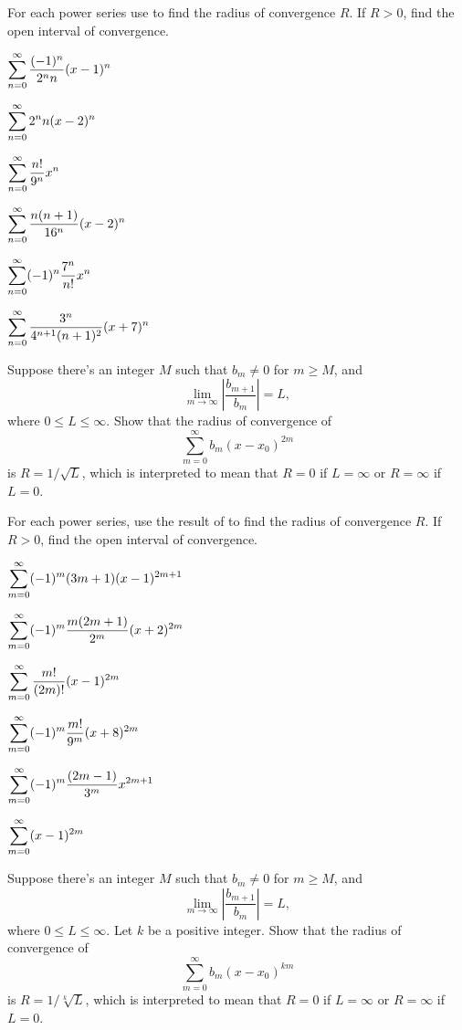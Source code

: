 \exercises
\begin{exerciselist}

\item\label{exer:7.1.1}For each power series use  to find the radius
of convergence $R$. If $R>0$, find the open interval of convergence.
\begin{alist*}[columns=2]
\item $\displaystyle{\sum_{n=0}^\infty\frac{(-1)^n}{2^nn}(x-1)^n}$
\item $\displaystyle{\sum_{n=0}^\infty 2^nn(x-2)^n}$
\item $\displaystyle{\sum_{n=0}^\infty\frac{n!}{9^n}x^n}$
\item $\displaystyle{\sum_{n=0}^\infty\frac{n(n+1)}{16^n}(x-2)^n}$
\item $\displaystyle{\sum_{n=0}^\infty (-1)^n\frac{7^n}{n!}x^n}$
\item $\displaystyle{\sum_{n=0}^\infty \frac{3^n}{4^{n+1}(n+1)^2}(x+7)^n}$
\end{alist*}

\item\label{exer:7.1.2}Suppose there's an
integer $M$ such that $b_m\ne0$ for $m\ge M$,  and
\[
\lim_{m\to\infty}\left|\frac{b_{m+1}}{b_m}\right|=L,
\]
where $0\le L\le\infty$. Show that the radius of convergence of
\[
\sum_{m=0}^\infty b_m(x-x_0)^{2m}
\]
is $R=1/\sqrt L$,
which is  interpreted  to mean that $R=0$ if $L=\infty$ or
$R=\infty$ if $L=0$.

\item\label{exer:7.1.3}For each power series, use the result of  to find
the radius of convergence $R$. If $R>0$, find the open interval of
convergence.
\begin{alist*}[columns=2]
\item $\displaystyle{\sum_{m=0}^\infty (-1)^m(3m+1)(x-1)^{2m+1}}$
\item $\displaystyle{\sum_{m=0}^\infty (-1)^m\frac{m(2m+1)}{2^m}(x+2)^{2m}}$
\item $\displaystyle{\sum_{m=0}^\infty\frac{m!}{(2m)!}(x-1)^{2m}}$
\item $\displaystyle{\sum_{m=0}^\infty (-1)^m\frac{m!}{9^m}(x+8)^{2m}}$
\item $\displaystyle{\sum_{m=0}^\infty(-1)^m\frac{(2m-1)}{3^m}x^{2m+1}}$
\item $\displaystyle{\sum_{m=0}^\infty(x-1)^{2m}}$
\end{alist*}

\item\label{exer:7.1.4}Suppose there's an integer $M$ such that $b_m\ne0$ for $m\ge M$,
and
\[
\lim_{m\to\infty}\left|\frac{b_{m+1}}{b_m}\right|=L,
\]
where $0\le L\le\infty$. Let $k$ be a positive integer. Show that the
radius of convergence of
\[
\sum_{m=0}^\infty b_m(x-x_0)^{km}
\]
is $R=1/\sqrt[k]L$, which is interpreted to mean that $R=0$ if
$L=\infty$ or $R=\infty$ if $L=0$. 


\end{exerciselist}
